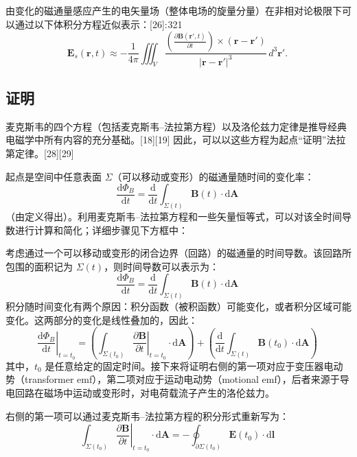 由变化的磁通量感应产生的电矢量场（整体电场的旋量分量）在非相对论极限下可以通过以下体积分方程近似表示：[26]: 321
\[
\mathbf{E}_s(\mathbf{r}, t) \approx -\frac{1}{4\pi} \iiint_V \frac{\left( \frac{\partial \mathbf{B}(\mathbf{r}', t)}{\partial t} \right) \times (\mathbf{r} - \mathbf{r}')}{|\mathbf{r} - \mathbf{r}'|^3} \, d^3\mathbf{r}'.~
\]
\subsection{证明}  
麦克斯韦的四个方程（包括麦克斯韦–法拉第方程）以及洛伦兹力定律是推导经典电磁学中所有内容的充分基础。[18][19] 因此，可以以这些方程为起点“证明”法拉第定律。[28][29]

起点是空间中任意表面 \( \Sigma \)（可以移动或变形）的磁通量随时间的变化率：
\[
\frac{\mathrm{d} \Phi_B}{\mathrm{d} t} = \frac{\mathrm{d}}{\mathrm{d} t} \int_{\Sigma(t)} \mathbf{B}(t) \cdot \mathrm{d} \mathbf{A}~
\]
（由定义得出）。利用麦克斯韦–法拉第方程和一些矢量恒等式，可以对该全时间导数进行计算和简化；详细步骤见下方框中：

考虑通过一个可以移动或变形的闭合边界（回路）的磁通量的时间导数。该回路所包围的面积记为 \( \Sigma(t) \)，则时间导数可以表示为：
\[
\frac{\mathrm{d} \Phi_B}{\mathrm{d} t} = \frac{\mathrm{d}}{\mathrm{d} t} \int_{\Sigma(t)} \mathbf{B}(t) \cdot \mathrm{d} \mathbf{A}~
\]
积分随时间变化有两个原因：积分函数（被积函数）可能变化，或者积分区域可能变化。这两部分的变化是线性叠加的，因此：
\[
\left. \frac{\mathrm{d} \Phi_B}{\mathrm{d} t} \right|_{t=t_0} = 
\left( \int_{\Sigma(t_0)} \left. \frac{\partial \mathbf{B}}{\partial t} \right|_{t=t_0} \cdot \mathrm{d} \mathbf{A} \right) + 
\left( \frac{\mathrm{d}}{\mathrm{d} t} \int_{\Sigma(t)} \mathbf{B}(t_0) \cdot \mathrm{d} \mathbf{A} \right)~
\]
其中，\( t_0 \) 是任意给定的固定时间。接下来将证明右侧的第一项对应于变压器电动势（transformer emf），第二项对应于运动电动势（motional emf），后者来源于导电回路在磁场中运动或变形时，对电荷载流子产生的洛伦兹力。

右侧的第一项可以通过麦克斯韦–法拉第方程的积分形式重新写为：
\[
\int_{\Sigma(t_0)} \left. \frac{\partial \mathbf{B}}{\partial t} \right|_{t=t_0} \cdot \mathrm{d} \mathbf{A} = 
-\oint_{\partial \Sigma(t_0)} \mathbf{E}(t_0) \cdot \mathrm{d} \mathbf{l}~
\]

